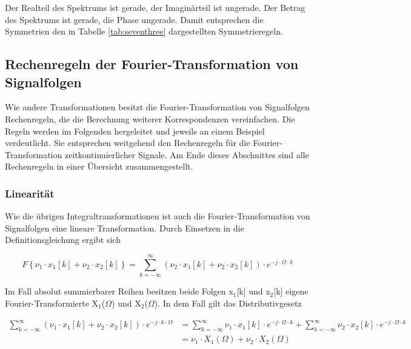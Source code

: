 \noindent Der Realteil des Spektrums ist gerade, der Imagin\"{a}rteil ist ungerade. Der Betrag des Spektrums ist gerade, die Phase ungerade. Damit entsprechen die Symmetrien den in Tabelle \ref{tab:seventhree} dargestellten Symmetrieregeln.

\clearpage

\subsection{Rechenregeln der Fourier-Transformation von Signalfolgen}

\noindent Wie andere Transformationen besitzt die Fourier-Transformation von Signalfolgen Rechenregeln, die die Berechnung weiterer Korrespondenzen vereinfachen. Die Regeln werden im Folgenden hergeleitet und jeweils an einem Beispiel verdeutlicht. Sie entsprechen weitgehend den Rechenregeln f\"{u}r die Fourier-Transformation zeitkontinuierlicher Signale. Am Ende dieses Abschnittes sind alle Rechenregeln in einer \"{U}bersicht zusammengestellt.

\subsubsection{Linearit\"{a}t}

\noindent Wie die \"{u}brigen Integraltransformationen ist auch die Fourier-Transformation von Signalfolgen eine lineare Transformation. Durch Einsetzen in die Definitionsgleichung ergibt sich

\begin{equation}\label{eq:sevenfiftytwo}
F\left\{\nu _{1} \cdot x_{1} \left[k\right]+\nu _{2} \cdot x_{2} \left[k\right]\right\}=\sum _{k=-\infty }^{\infty }\left(\nu _{2} \cdot x_{1} \left[k\right]+\nu _{2} \cdot x_{2} \left[k\right]\right)\cdot e^{-j\cdot \Omega \cdot k}
\end{equation}

\noindent Im Fall absolut summierbarer Reihen besitzen beide Folgen x${}_{1}$[k] und x${}_{2}$[k] eigene Fourier-Transformierte X${}_{1}$($\Omega$) und X${}_{2}$($\Omega$). In dem Fall gilt das Distributivgesetz

\begin{equation}\label{eq:sevenfiftythree}
\begin{split}
\sum _{k=-\infty }^{\infty }\left(\nu _{1} \cdot x_{1} \left[k\right]+\nu _{2} \cdot x_{2} \left[k\right]\right)\cdot e^{-j\cdot k\cdot \Omega} & = \sum _{k=-\infty }^{\infty }\nu _{1} \cdot x_{1} \left[k\right]\cdot e^{-j\cdot \Omega \cdot k}  +\sum _{k=-\infty }^{\infty }\nu _{2} \cdot x_{2} \left[k\right]\cdot e^{-j\cdot \Omega \cdot k} \\ 
& =\nu _{1} \cdot X_{1} \left(\Omega \right)+\nu _{2} \cdot X_{2} \left(\Omega \right)
\end{split}
\end{equation}

